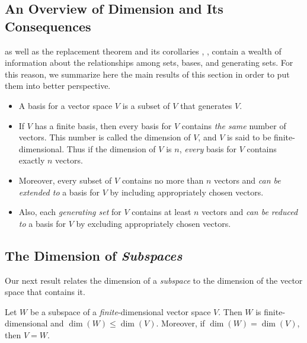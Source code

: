 \subsection{An Overview of Dimension and Its Consequences}
 as well as the replacement theorem  and its corollaries , , 
contain a wealth of information about the relationships among \LID{} sets, bases, and generating sets.
For this reason, we summarize here the main results of this section in order to put them into better perspective.
\begin{itemize}
\item A basis for a vector space \(V\) is a \LID{} subset of \(V\) that generates \(V\).
\item If \(V\) has a finite basis, then every basis for \(V\) contains \emph{the same} number of vectors.
    This number is called the dimension of \(V\), and \(V\) is said to be finite-dimensional.
    Thus if the dimension of \(V\) is \(n\), \emph{every} basis for \(V\) contains exactly \(n\) vectors.
\item Moreover, every \emph{\LID{}} subset of \(V\) contains no more than \(n\) vectors and \emph{can be extended to} a basis for \(V\) by including appropriately chosen vectors.
\item Also, each \emph{generating set} for \(V\) contains at least \(n\) vectors and \emph{can be reduced to} a basis for \(V\) by excluding appropriately chosen vectors.
\end{itemize}

\subsection{The Dimension of \emph{Subspaces}}
Our next result relates the dimension of a \emph{subspace} to the dimension of the vector space that contains it.

\begin{theorem} \label{thm 1.11}
Let \(W\) be a subspace of a \emph{finite}-dimensional vector space \(V\).
Then  \(W\) is finite-dimensional and \(\dim(W) \le \dim(V)\).
 Moreover, if \(\dim(W) = \dim(V)\), then \(V = W\).
\end{theorem}

